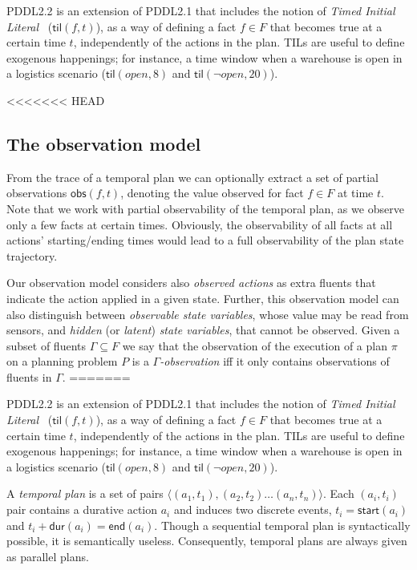 \documentclass[runningheads]{llncs}
\newcommand{\tup}[1]{{\langle #1 \rangle}}
\newcommand{\dur}{\mathsf{dur}}    %
\newcommand{\obs}{\mathsf{obs}}    %
\newcommand{\start}{\mathsf{start}}%
\newcommand{\en}{\mathsf{end}}     %
\newcommand{\til}{\mathsf{til}}    %
\begin{document}
PDDL2.2 is an extension of PDDL2.1 that includes the notion of {\em Timed Initial Literal}~\cite{hoffmann2005} ($\til(f,t)$), as a way of defining a fact $f\in F$ that becomes true at a certain time $t$, independently of the actions in the plan. TILs are useful to define exogenous happenings; for instance, a time window when a warehouse is open in a logistics scenario ($\til(open,8)$ and $\til(\neg open,20)$).

<<<<<<< HEAD
 
\subsection{The observation model}
\label{sec:omodel}
From the trace of a temporal plan we can optionally extract a set of partial observations $\obs(f,t)$, denoting the value observed for fact $f \in F$ at time $t$. Note that we work with partial observability of the temporal plan, as we observe only a few facts at certain times. Obviously, the observability of all facts at all actions' starting/ending times would lead to a full observability of the plan state trajectory.

Our observation model considers also {\em observed actions} as extra fluents that indicate the action applied in a given state. Further, this observation model can also distinguish between {\em observable state variables}, whose value may be read from sensors, and {\em hidden} (or {\em latent}) {\em state variables}, that cannot be observed. Given a subset of fluents $\Gamma\subseteq F$ we say that the observation of the execution of a plan $\pi$ on a planning problem $P$ is a {\em $\Gamma$-observation} iff it only contains observations of fluents in $\Gamma$.
=======

PDDL2.2 is an extension of PDDL2.1 that includes the notion of {\em Timed Initial Literal}~\cite{hoffmann2005} ($\til(f,t)$), as a way of defining a fact $f\in F$ that becomes true at a certain time $t$, independently of the actions in the plan. TILs are useful to define exogenous happenings; for instance, a time window when a warehouse is open in a logistics scenario ($\til(open,8)$ and $\til(\neg open,20)$).

A {\em temporal plan} is a set of pairs $\tup{(a_1,t_1),(a_2,t_2)\ldots (a_n,t_n)}$. Each $(a_i,t_i)$ pair contains a durative action $a_i$ and induces two discrete events, $t_i=\start(a_i)$ and $t_i+\dur(a_i)=\en(a_i)$. Though a sequential temporal plan is syntactically possible, it is semantically useless. Consequently, temporal plans are always given as parallel plans.
\end{document}
